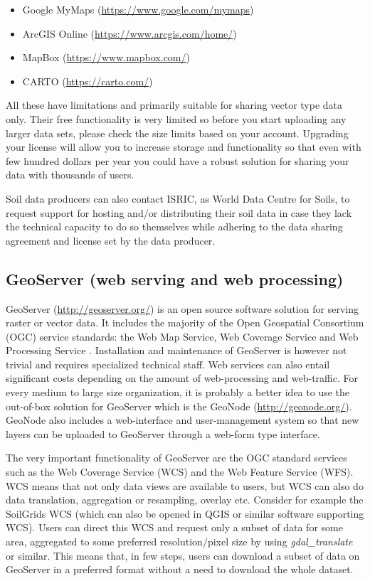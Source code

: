 \documentclass[10pt,b5paper,]{book}
\providecommand{\tightlist}{%
  \setlength{\itemsep}{0pt}\setlength{\parskip}{0pt}}
\theoremstyle{definition}
\theoremstyle{definition}
\theoremstyle{definition}
\theoremstyle{remark}
\begin{document}
\begin{itemize}
\tightlist
\item
  Google MyMaps (\url{https://www.google.com/mymaps})
\item
  ArcGIS Online (\url{https://www.arcgis.com/home/})
\item
  MapBox (\url{https://www.mapbox.com/})
\item
  CARTO (\url{https://carto.com/})
\end{itemize}

All these have limitations and primarily suitable for sharing vector
type data only. Their free functionality is very limited so before you
start uploading any larger data sets, please check the size limits based
on your account. Upgrading your license will allow you to increase
storage and functionality so that even with few hundred dollars per year
you could have a robust solution for sharing your data with thousands of
users.

Soil data producers can also contact ISRIC, as World Data Centre for
Soils, to request support for hosting and/or distributing their soil
data in case they lack the technical capacity to do so themselves while
adhering to the data sharing agreement and license set by the data
producer.

\hypertarget{geoserver-web-serving-and-web-processing}{%
\subsection{GeoServer (web serving and web
processing)}\label{geoserver-web-serving-and-web-processing}}

GeoServer (\url{http://geoserver.org/}) is an open source software
solution for serving raster or vector data. It includes the majority of
the Open Geospatial Consortium (OGC) service standards: the Web Map
Service, Web Coverage Service and Web Processing Service
\citep{youngblood2013geoserver}. Installation and maintenance of
GeoServer is however not trivial and requires specialized technical
staff. Web services can also entail significant costs depending on the
amount of web-processing and web-traffic. For every medium to large size
organization, it is probably a better idea to use the out-of-box
solution for GeoServer which is the GeoNode (\url{http://geonode.org/}).
GeoNode also includes a web-interface and user-management system so that
new layers can be uploaded to GeoServer through a web-form type
interface.

The very important functionality of GeoServer are the OGC standard
services such as the Web Coverage Service (WCS) and the Web Feature
Service (WFS). WCS means that not only data views are available to
users, but WCS can also do data translation, aggregation or resampling,
overlay etc. Consider for example the SoilGrids WCS (which can also be
opened in QGIS or similar software supporting WCS). Users can direct
this WCS and request only a subset of data for some area, aggregated to
some preferred resolution/pixel size by using \emph{gdal\_translate} or
similar. This means that, in few steps, users can download a subset of
data on GeoServer in a preferred format without a need to download the
whole dataset.
\end{document}
